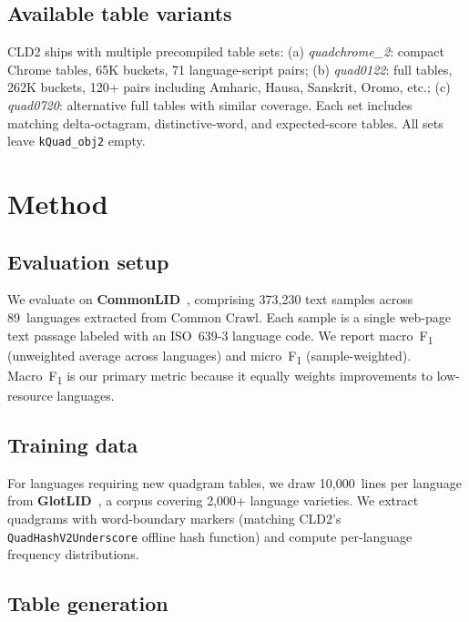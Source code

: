 \documentclass{article}
\newcommand{\fone}{F\textsubscript{1}}
\begin{document}
\subsection{Available table variants}

CLD2 ships with multiple precompiled table sets:
(a) \emph{quadchrome\_2}: compact Chrome tables, 65K buckets, 71 language-script pairs;
(b) \emph{quad0122}: full tables, 262K buckets, 120+ pairs including Amharic, Hausa, Sanskrit, Oromo, etc.;
(c) \emph{quad0720}: alternative full tables with similar coverage.
Each set includes matching delta-octagram, distinctive-word, and expected-score tables.
All sets leave \texttt{kQuad\_obj2} empty.

\section{Method}
\label{sec:method}

\subsection{Evaluation setup}

We evaluate on \textbf{CommonLID}~\citep{commonlid}, comprising 373,230 text samples across 89~languages extracted from Common Crawl.
Each sample is a single web-page text passage labeled with an ISO~639-3 language code.
We report macro~\fone{} (unweighted average across languages) and micro~\fone{} (sample-weighted).
Macro~\fone{} is our primary metric because it equally weights improvements to low-resource languages.

\subsection{Training data}

For languages requiring new quadgram tables, we draw 10,000~lines per language from \textbf{GlotLID}~\citep{kargaran-etal-2023-glotlid}, a corpus covering 2,000+ language varieties.
We extract quadgrams with word-boundary markers (matching CLD2's \texttt{QuadHashV2Underscore} offline hash function) and compute per-language frequency distributions.

\subsection{Table generation}
\label{sec:tablegen}
\end{document}
